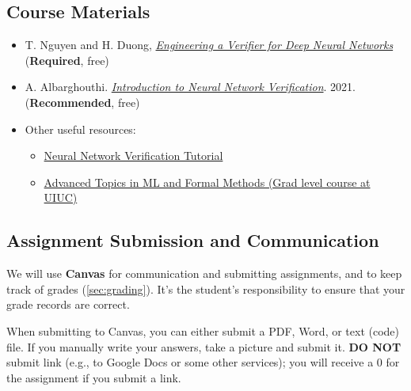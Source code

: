 \documentclass[11pt]{article}
\begin{document}
\subsection{Course Materials}
\begin{itemize}
    \item T. Nguyen and H. Duong, \href{https://roars.dev/book_nnv/book.pdf}{\emph{Engineering a Verifier for Deep Neural Networks}} (\textbf{Required}, free)


    \item A. Albarghouthi. \href{https://arxiv.org/pdf/2109.10317}{\emph{Introduction to Neural Network Verification}}. 2021. (\textbf{Recommended}, free)

    \item Other useful resources:
\begin{itemize}
  \item \href{https://neural-network-verification.com/}{Neural Network Verification Tutorial}
  \item \href{https://publish.illinois.edu/ece598hz-fall2024/course-schedule/}{Advanced Topics in ML and Formal Methods (Grad level course at UIUC)}
\end{itemize}

\end{itemize}

\subsection{Assignment Submission and Communication}

We will use \textbf{Canvas} for communication and submitting assignments, and to keep track of grades (\autoref{sec:grading}).  
It's the student's responsibility to ensure that your grade records are correct.

When submitting to Canvas, you can either submit a PDF, Word, or text (code) file.  If you manually write your answers, take a picture and submit it.  \textbf{DO NOT} submit link (e.g., to Google Docs or some other services); you will receive a 0 for the assignment if you submit a link.





\end{document}
